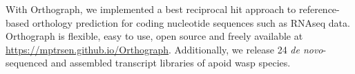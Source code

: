 With Orthograph, we implemented a best reciprocal hit approach to
reference-based orthology prediction for coding nucleotide sequences
such as RNAseq data. Orthograph is flexible, easy to use, open source
and freely available at \url{https://mptrsen.github.io/Orthograph}.
Additionally, we release 24 \emph{de novo}-sequenced and assembled
transcript libraries of apoid wasp species.
